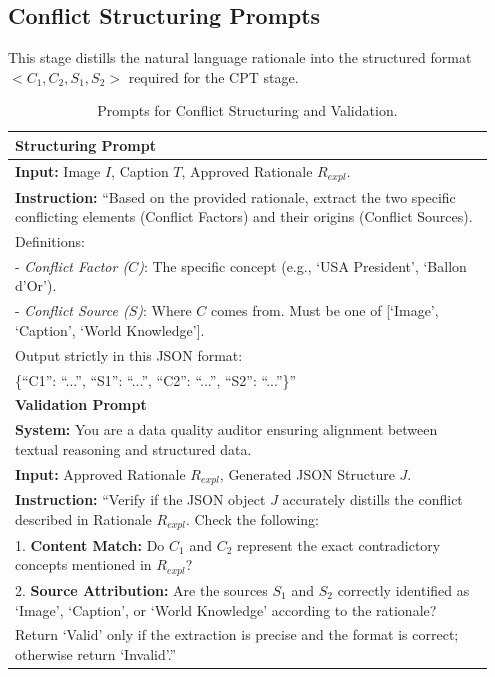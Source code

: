 \documentclass{article}
\theoremstyle{plain}
\theoremstyle{definition}
\theoremstyle{remark}
\begin{document}
\subsection{Conflict Structuring Prompts}
This stage distills the natural language rationale into the structured format $<C_1, C_2, S_1, S_2>$ required for the CPT stage.

\begin{table}[H]
    \centering
    \caption{Prompts for Conflict Structuring and Validation.}
    \label{tab:prompt_structuring}
    \begin{tabular}{p{0.95\linewidth}}
        \toprule
        \textbf{Structuring Prompt} \\
        \midrule
        \textbf{Input:} Image $I$, Caption $T$, Approved Rationale $R_{expl}$. \\
        \textbf{Instruction:} ``Based on the provided rationale, extract the two specific conflicting elements (Conflict Factors) and their origins (Conflict Sources). \\
        Definitions: \\
        - \textit{Conflict Factor ($C$)}: The specific concept (e.g., `USA President', `Ballon d'Or'). \\
        - \textit{Conflict Source ($S$)}: Where $C$ comes from. Must be one of [`Image', `Caption', `World Knowledge']. \\
        
        Output strictly in this JSON format: \\
        \{``C1'': ``...'', ``S1'': ``...'', ``C2'': ``...'', ``S2'': ``...''\}'' \\
        \midrule
        \textbf{Validation Prompt} \\
        \midrule
        \textbf{System:} You are a data quality auditor ensuring alignment between textual reasoning and structured data. \\
        \textbf{Input:} Approved Rationale $R_{expl}$, Generated JSON Structure $J$. \\
        \textbf{Instruction:} ``Verify if the JSON object $J$ accurately distills the conflict described in Rationale $R_{expl}$. Check the following: \\
        1. \textbf{Content Match:} Do $C_1$ and $C_2$ represent the exact contradictory concepts mentioned in $R_{expl}$? \\
        2. \textbf{Source Attribution:} Are the sources $S_1$ and $S_2$ correctly identified as `Image', `Caption', or `World Knowledge' according to the rationale? \\
        Return `Valid' only if the extraction is precise and the format is correct; otherwise return `Invalid'.'' \\
        \bottomrule
    \end{tabular}
\end{table}
\end{document}
